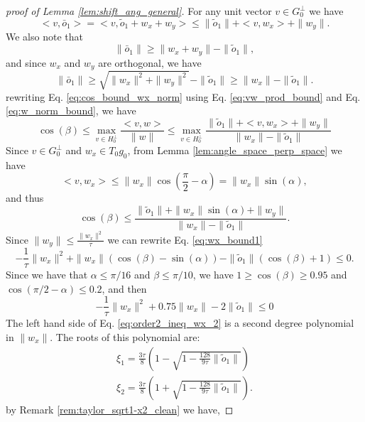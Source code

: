 \documentclass[12pt]{article}
\theoremstyle{remark}
\begin{document}
\begin{appendices}
\begin{proof}[proof of Lemma \ref{lem:shift_ang_general}]
For any unit vector $v\in G_0^\perp$ we have
\begin{equation}\label{eq:vw_prod_bound}
 <v,\bar o_1> = <v,\tilde o_1 + w_x + w_y> \leq \|\tilde o_1\| + <v,w_x> + \|w_y\|.   
\end{equation}
We also note that 
\[
    \|\bar o_1\| \geq \|w_x +w_y\| - \|\tilde o_1\| ,
\]
and since $w_x$ and $w_y$ are orthogonal, we have
\begin{equation}\label{eq:w_norm_bound}
\|\bar o_1\| \geq \sqrt{\|w_x\|^2 + \|w_y\|^2} - \|\tilde o_1\| \geq \|w_x\| - \|\tilde o_1\|.    
\end{equation}
rewriting Eq. \eqref{eq:cos_bound_wx_norm} using Eq. \eqref{eq:vw_prod_bound} and Eq. \eqref{eq:w_norm_bound}, we have
\[
    \cos\left(\beta\right)\leq \max\limits_{v\in H_0^\perp} \frac{<v,w>}{\|w\|} \leq \max\limits_{v\in H_0^\perp} \frac{\|\tilde o_1\| + <v,w_x> + \|w_y\| }{\|w_x\| - \|\tilde o_1\|}
\]
Since $v\in G_0^\perp$ and $w_x\in T_0g_0$, from Lemma \ref{lem:angle_space_perp_space} we have
\[
    <v,w_x> \leq \|w_x\| \cos(\frac{\pi}{2} - \alpha) = \|w_x\| \sin(\alpha),
\]
and thus
\begin{equation}\label{eq:wx_bound1}
    \cos\left(\beta\right) \leq
 \frac{\|\tilde o_1\| + \|w_x\| \sin(\alpha) + \|w_y\| }{\|w_x\| - \|\tilde o_1\|}.
\end{equation}
Since $\|w_y\| \leq \frac{\|w_x\|^2}{\tau}$ we can rewrite Eq. \eqref{eq:wx_bound1}
\begin{equation}\label{eq:order2_ineq_wx}
-\frac{1}{\tau}\|w_x\|^2+\|w_x\|\left(\cos\left(\beta\right) - \sin( \alpha)\right) - \|\tilde o_1\| \left( \cos\left(\beta\right) + 1 \right) \leq 0.    
\end{equation}
Since we have that $\alpha \leq \pi/16$ and $\beta \leq \pi/10 $, we have  $1 \geq \cos(\beta)\geq 0.95$ and $\cos (\pi/2-\alpha) \leq 0.2$, and then
\begin{equation}\label{eq:order2_ineq_wx_2}
-\frac{1}{\tau}\|w_x\|^2+0.75 \|w_x\|  -2 \|\tilde o_1\| \leq 0 
\end{equation}
The left hand side of Eq. \eqref{eq:order2_ineq_wx_2} is a second degree polynomial in $\|w_x\|$. The roots of this polynomial are:
\[
\begin{array}{cc}
    \xi_1 =  \frac{3\tau}{8}\left(1 - \sqrt{1-\frac{128}{9\tau} \|\tilde o_1\|}\right) \\
    \xi_2 = \frac{3\tau}{8} \left(1 + \sqrt{1-\frac{128}{9\tau} \|\tilde o_1\|}\right).
\end{array}
\]
by Remark \ref{rem:taylor_sqrt1-x2_clean} we have,

\end{proof}
\end{appendices}
\end{document}
